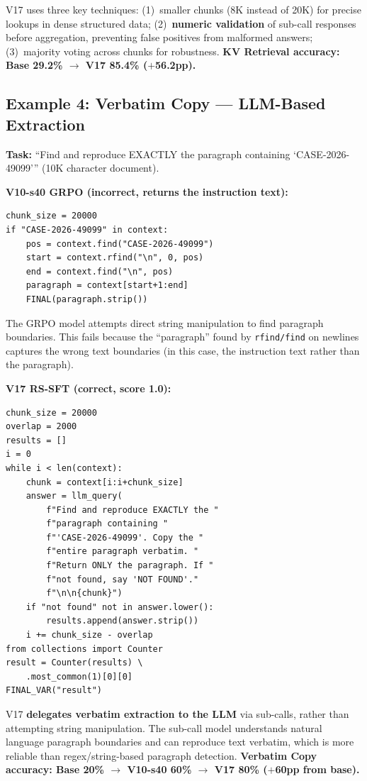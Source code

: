 \documentclass{article}
\begin{document}
V17 uses three key techniques: (1)~smaller chunks (8K instead of 20K) for precise lookups in dense structured data; (2)~\textbf{numeric validation} of sub-call responses before aggregation, preventing false positives from malformed answers; (3)~majority voting across chunks for robustness. \textbf{KV Retrieval accuracy: Base 29.2\% $\to$ V17 85.4\% ($+$56.2pp).}

\subsection{Example 4: Verbatim Copy --- LLM-Based Extraction}
\label{app:traj-verbatim}

\textbf{Task:} ``Find and reproduce EXACTLY the paragraph containing `CASE-2026-49099''' (10K character document).

\textbf{V10-s40 GRPO (incorrect, returns the instruction text):}
{\footnotesize
\begin{verbatim}
chunk_size = 20000
if "CASE-2026-49099" in context:
    pos = context.find("CASE-2026-49099")
    start = context.rfind("\n", 0, pos)
    end = context.find("\n", pos)
    paragraph = context[start+1:end]
    FINAL(paragraph.strip())
\end{verbatim}
}

The GRPO model attempts direct string manipulation to find paragraph boundaries. This fails because the ``paragraph'' found by \texttt{rfind/find} on newlines captures the wrong text boundaries (in this case, the instruction text rather than the paragraph).

\textbf{V17 RS-SFT (correct, score 1.0):}
{\footnotesize
\begin{verbatim}
chunk_size = 20000
overlap = 2000
results = []
i = 0
while i < len(context):
    chunk = context[i:i+chunk_size]
    answer = llm_query(
        f"Find and reproduce EXACTLY the "
        f"paragraph containing "
        f"'CASE-2026-49099'. Copy the "
        f"entire paragraph verbatim. "
        f"Return ONLY the paragraph. If "
        f"not found, say 'NOT FOUND'."
        f"\n\n{chunk}")
    if "not found" not in answer.lower():
        results.append(answer.strip())
    i += chunk_size - overlap
from collections import Counter
result = Counter(results) \
    .most_common(1)[0][0]
FINAL_VAR("result")
\end{verbatim}
}

V17 \textbf{delegates verbatim extraction to the LLM} via sub-calls, rather than attempting string manipulation. The sub-call model understands natural language paragraph boundaries and can reproduce text verbatim, which is more reliable than regex/string-based paragraph detection. \textbf{Verbatim Copy accuracy: Base 20\% $\to$ V10-s40 60\% $\to$ V17 80\% ($+$60pp from base).}
\end{document}
